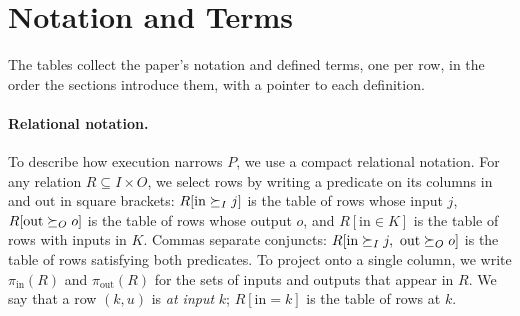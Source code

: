 \section{Notation and Terms}
\label{app:notation}

The tables collect the paper's notation and defined terms, one per row, in the
order the sections introduce them, with a pointer to each definition.

\paragraph{Relational notation.}
To describe how execution narrows $P$, we use a compact relational notation.
For any relation
$R\subseteq I\times O$, we select rows by writing a predicate on its
columns $\mathrm{in}$ and $\mathrm{out}$ in square brackets: $R[\mathrm{in}\succeq_I j]$ is the table of rows
whose input \inrel $j$, $R[\mathrm{out}\succeq_O o]$ is the table of rows
whose output \outrel $o$, and $R[\mathrm{in}\in K]$ is
the table of rows with inputs in $K$.  Commas separate conjuncts:
$R[\mathrm{in}\succeq_I j,\ \mathrm{out}\succeq_O o]$ is the table of rows
satisfying both predicates.
To project onto a single column, we write $\pi_{\mathrm{in}}(R)$ and
$\pi_{\mathrm{out}}(R)$ for the sets of inputs and outputs that appear in $R$.
We say that a row $(k,u)$ is \emph{at input} $k$; $R[\mathrm{in}=k]$ is the table of
rows at $k$.

